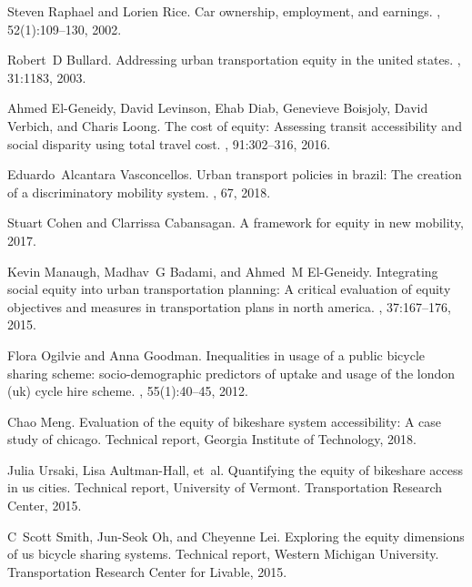 Steven Raphael and Lorien Rice.
\newblock Car ownership, employment, and earnings.
, 52(1):109--130, 2002.

Robert~D Bullard.
\newblock Addressing urban transportation equity in the united states.
, 31:1183, 2003.

Ahmed El-Geneidy, David Levinson, Ehab Diab, Genevieve Boisjoly, David Verbich,
  and Charis Loong.
\newblock The cost of equity: Assessing transit accessibility and social
  disparity using total travel cost.
,
  91:302--316, 2016.

Eduardo~Alcantara Vasconcellos.
\newblock Urban transport policies in brazil: The creation of a discriminatory
  mobility system.
, 67, 2018.

Stuart Cohen and Clarrissa Cabansagan.
\newblock A framework for equity in new mobility, 2017.

Kevin Manaugh, Madhav~G Badami, and Ahmed~M El-Geneidy.
\newblock Integrating social equity into urban transportation planning: A
  critical evaluation of equity objectives and measures in transportation plans
  in north america.
, 37:167--176, 2015.

Flora Ogilvie and Anna Goodman.
\newblock Inequalities in usage of a public bicycle sharing scheme:
  socio-demographic predictors of uptake and usage of the london (uk) cycle
  hire scheme.
, 55(1):40--45, 2012.

Chao Meng.
\newblock Evaluation of the equity of bikeshare system accessibility: A case
  study of chicago.
\newblock Technical report, Georgia Institute of Technology, 2018.

Julia Ursaki, Lisa Aultman-Hall, et~al.
\newblock Quantifying the equity of bikeshare access in us cities.
\newblock Technical report, University of Vermont. Transportation Research
  Center, 2015.

C~Scott Smith, Jun-Seok Oh, and Cheyenne Lei.
\newblock Exploring the equity dimensions of us bicycle sharing systems.
\newblock Technical report, Western Michigan University. Transportation
  Research Center for Livable, 2015.


